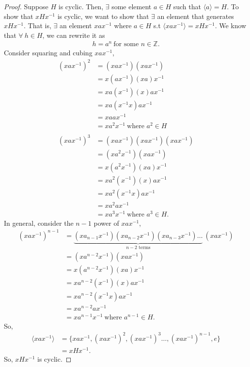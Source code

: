 \documentclass[12pt, letterpaper]{article}
\begin{document}
\begin{proof}
    Suppose $H$ is cyclic. Then, $\exists$ some element $a \in H$ such that $\langle a \rangle = H$. To show that $xHx^{-1}$ is cyclic, we want to show that $\exists$ an element that generates $xHx^{-1}$. That is, $\exists$ an element $xax^{-1}$ where $a \in H$ s.t $\langle xax^{-1} \rangle = xHx^{-1}$. We know that $\forall \ h \in H$, we can rewrite it as 
    \begin{align*}
        h = a^{n} \ \text{for some $n \in \mathbb{Z}$}.
    \end{align*}
    Consider squaring and cubing $xax^{-1}$, 
    \begin{align*}
        (xax^{-1})^{2} &= (xax^{-1})(xax^{-1}) \\
        &= x(ax^{-1})(xa)x^{-1} \\
        &= xa(x^{-1})(x)ax^{-1} \\
        &= xa(x^{-1}x)ax^{-1} \\
        &= xaax^{-1} \\
        &= xa^{2}x^{-1} \ \text{where $a^{2} \in H$} \\ \\
        (xax^{-1})^{3} &= (xax^{-1})(xax^{-1})(xax^{-1}) \\
        &= (xa^{2}x^{-1})(xax^{-1}) \\
        &= x(a^{2}x^{-1})(xa)x^{-1} \\
        &= xa^{2}(x^{-1})(x)ax^{-1} \\
        &= xa^{2}(x^{-1}x)ax^{-1} \\
        &= xa^{2}ax^{-1} \\
        &= xa^{3}x^{-1} \ \text{where $a^{3} \in H$}.
    \end{align*}
    In general, consider the $n -1$ power of $xax^{-1}$,
    \begin{align*}
        (xax^{-1})^{n-1} &= \underbrace{(xa_{n-1}x^{-1})(xa_{n-2}x^{-1})(xa_{n-3}x^{-1})\ldots}_{\text{$n-2$ terms}} \ (xax^{-1}) \\
        &= (xa^{n-2}x^{-1})(xax^{-1}) \\
        &= x(a^{n-2}x^{-1})(xa)x^{-1} \\
        &= xa^{n-2}(x^{-1})(x)ax^{-1} \\
        &= xa^{n-2}(x^{-1}x)ax^{-1} \\
        &= xa^{n-2}ax^{-1} \\
        &= xa^{n-1}x^{-1} \ \text{where $a^{n-1} \in H$}.
    \end{align*}
    So, 
    \begin{align*}
        \langle xax^{-1} \rangle &= \{xax^{-1}, (xax^{-1})^{2}, (xax^{-1})^{3}\ldots, (xax^{-1})^{n-1}, e\} \\
        &= xHx^{-1}.
    \end{align*}
    So, $xHx^{-1}$ is cyclic.
\end{proof}
\end{document}

